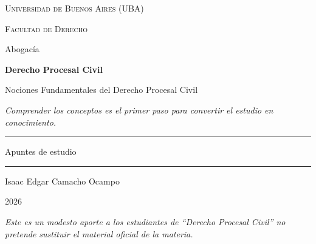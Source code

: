 \documentclass[12pt,oneside]{book}
\newcommand{\universidad}{Universidad de Buenos Aires (UBA)}
\newcommand{\facultad}{Facultad de Derecho}
\newcommand{\carrera}{Abogacía}
\newcommand{\materia}{Derecho Procesal Civil}
\newcommand{\titulo}{Nociones Fundamentales del Derecho Procesal Civil}
\newcommand{\autor}{Isaac Edgar Camacho Ocampo}
\newcommand{\anio}{2026}
\newcommand{\reflexion}{Comprender los conceptos es el primer paso para convertir el estudio en conocimiento.}
\begin{document}
\begin{titlepage}
\thispagestyle{empty}
\begin{center}

\vspace*{1cm}

{\large \textsc{\universidad}}

\vspace{0.2cm}

{\large \textsc{\facultad}}

\vspace{0.2cm}

{\large \carrera}

\vspace{3cm}

{\Huge \textbf{\materia}}

\vspace{1cm}

{\LARGE \titulo}

\vspace{0.8cm}

\textit{\reflexion}

\vspace{1.2cm}

\rule{0.70\textwidth}{0.5pt}

\vspace{0.5cm}

{\large Apuntes de estudio}

\vspace{0.5cm}

\rule{0.70\textwidth}{0.5pt}

\vfill

{\large \autor}

\vspace{0.3cm}

{\large \anio}

\end{center}

\vfill

\begin{flushleft}
\textit{Este es un modesto aporte a los estudiantes de ``\materia'' no pretende sustituir el material oficial de la materia.}
\end{flushleft}
\end{titlepage}

\frontmatter
\tableofcontents
\mainmatter
\end{document}
